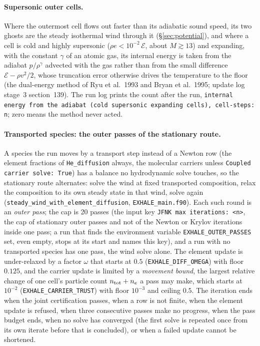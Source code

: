 \documentclass[english,a4paper]{my_memo}
\begin{document}
\paragraph{Supersonic outer cells.} Where the outermost cell flows out faster
than its adiabatic sound speed, its two ghosts are the steady isothermal wind
through it (\S\ref{sec:potential}), and where a cell is cold and highly
supersonic ($\rho e<10^{-2}\,\mathcal E$, about $M\gtrsim13$) and expanding,
with the constant $\gamma$ of an atomic gas, its internal energy is taken from
the adiabat $p/\rho^\gamma$ advected with the gas rather than from the small
difference $\mathcal E-\rho v^2/2$, whose truncation error otherwise drives
the temperature to the floor (the dual-energy method of Ryu et al.\ 1993 and
Bryan et al.\ 1995; update log stage~3 section~139). The run log prints the
count after the run, \texttt{internal energy from the adiabat (cold supersonic
expanding cells), cell-steps: n}; zero means the method never acted.

\paragraph{Transported species: the outer passes of the stationary route.}
A species the run moves by a transport step instead of a Newton row (the
element fractions of \texttt{He\_diffusion} always, the molecular carriers
unless \texttt{Coupled carrier solve: True}) has a balance no hydrodynamic
solve touches, so the stationary route alternates: solve the wind at fixed
transported composition, relax the composition to its own steady state in
that wind, solve again (\texttt{steady\_wind\_with\_element\_diffusion},
\texttt{EXHALE\_main.f90}). Each such round is an \emph{outer pass}; the cap
is 20 passes (the input key \texttt{JFNK max iterations: <n>}, the cap of
stationary outer passes and not of the Newton or Krylov iterations inside one
pass; a run that finds the environment variable
\texttt{EXHALE\_OUTER\_PASSES} set, even empty, stops at its start and names
this key), and a run with no
transported species has one pass, the wind solve alone. The element update is
under-relaxed by a factor $\omega$ that starts at $0.5$
(\texttt{EXHALE\_DIFF\_OMEGA}) with floor $0.125$, and the carrier update is
limited by a \emph{movement bound}, the largest relative change of one cell's
particle count $n_{\rm tot}+n_e$ a pass may make, which starts at $10^{-2}$
(\texttt{EXHALE\_CARRIER\_TRUST}) with floor $10^{-3}$ and ceiling $0.5$.
The iteration ends when the joint certification passes, when a row is not
finite, when the element update is refused, when three consecutive passes make
no progress, when the pass budget ends, when no solve has converged (the first
solve is repeated once from its own iterate before that is concluded), or when
a failed update cannot be shortened.
\end{document}
